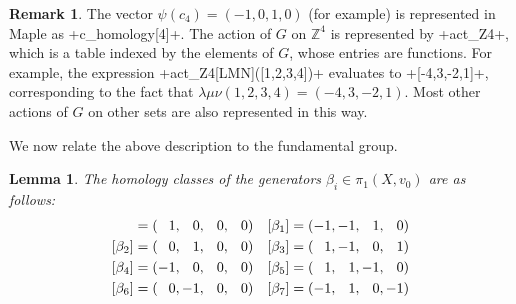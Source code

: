 \documentclass[reqno]{amsart}
\newcommand{\bt}        {\beta}
\newcommand{\lm}        {\lambda}
\newcommand{\Z}         {{\mathbb{Z}}}
\newcommand{\pp}        {\hphantom{+}}
\renewcommand{\:}{\colon}
\newtheorem{lemma}[theorem]{Lemma}
\theoremstyle{definition}
\newtheorem{remark}[theorem]{Remark}
\begin{document}
\begin{remark}
 The vector $\psi(c_4)=(-1,0,1,0)$ (for example) is represented in
 Maple as \mcode+c_homology[4]+.  The action of $G$ on $\Z^4$ is
 represented by \mcode+act_Z4+, which is a table indexed by the
 elements of $G$, whose entries are functions.  For example, the
 expression \mcode+act_Z4[LMN]([1,2,3,4])+ evaluates to
 \mcode+[-4,3,-2,1]+, corresponding to the fact that
 $\lm\mu\nu(1,2,3,4)=(-4,3,-2,1)$.  Most other actions of $G$ on other
 sets are also represented in this way.
\end{remark}

We now relate the above description to the fundamental group.
\begin{lemma}
 The homology classes of the generators $\bt_i\in\pi_1(X,v_0)$ are as
 follows:
 \begin{align*}
  [\bt_0] &= (\pp 1,\pp 0,\pp 0,\pp 0) &
  [\bt_1] &= (   -1,   -1,\pp 1,\pp 0) \\
  [\bt_2] &= (\pp 0,\pp 1,\pp 0,\pp 0) &
  [\bt_3] &= (\pp 1,   -1,\pp 0,\pp 1) \\
  [\bt_4] &= (   -1,\pp 0,\pp 0,\pp 0) &
  [\bt_5] &= (\pp 1,\pp 1,   -1,\pp 0) \\
  [\bt_6] &= (\pp 0,   -1,\pp 0,\pp 0) &
  [\bt_7] &= (   -1,\pp 1,\pp 0,   -1)
 \end{align*}
\end{lemma}
\end{document}
